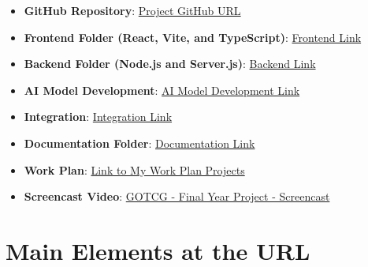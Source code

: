 \begin{itemize}
    \item \textbf{GitHub Repository}: \href{https://github.com/tomaspettit2506/final-year-project}{Project GitHub URL}
    \item \textbf{Frontend Folder (React, Vite, and TypeScript)}: 
    \href{https://github.com/tomaspettit2506/final-year-project/tree/main/frontend}{Frontend Link}
    \item \textbf{Backend Folder (Node.js and Server.js)}: 
    \href{https://github.com/tomaspettit2506/final-year-project/tree/main/backend}{Backend Link}
    \item \textbf{AI Model Development}: 
    \href{https://github.com/tomaspettit2506/final-year-project/tree/main/AI-Model-Dev}{AI Model Development Link}
    \item \textbf{Integration}:
    \href{https://github.com/tomaspettit2506/final-year-project/tree/main/integration}{Integration Link}
    \item \textbf{Documentation Folder}: 
    \href{https://github.com/tomaspettit2506/final-year-project/tree/main/docs}{Documentation Link}
    \item \textbf{Work Plan}:  \href{https://github.com/users/tomaspettit2506/projects/6}{Link to My Work Plan Projects}
    \item \textbf{Screencast Video}: \href{https://youtu.be/7gg2fioyUZk}{GOTCG - Final Year Project - Screencast}
\end{itemize}

\section*{Main Elements at the URL}

